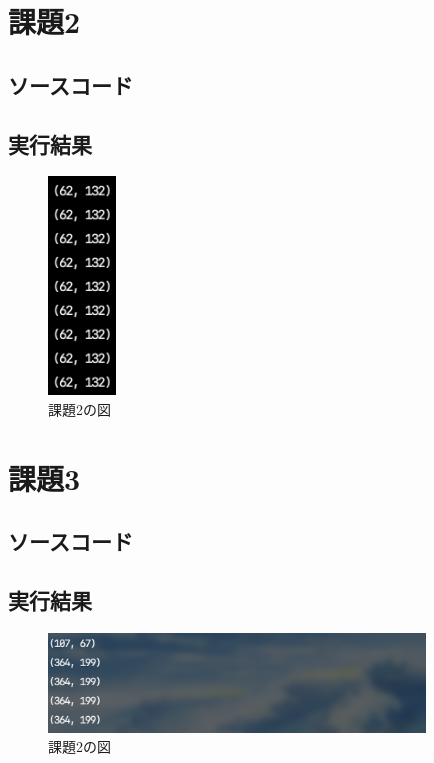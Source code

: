 \documentclass[a4paper,11pt,titlepage]{bxjsarticle}
\begin{document}
\section{課題2}
\subsection{ソースコード}

\subsection{実行結果}
\begin{figure}[htbp]
 \begin{center}
  \includegraphics[width=18mm]{kadai2.png}
 \end{center}
 \caption{課題2の図}
 \label{fig:one}
\end{figure}
\section{課題3}
\subsection{ソースコード}

\subsection{実行結果}
\begin{figure}[htbp]
 \begin{center}
  \includegraphics[width=100mm]{kadai3.png}
 \end{center}
 \caption{課題2の図}
 \label{fig:one}
\end{figure}
\end{document}
